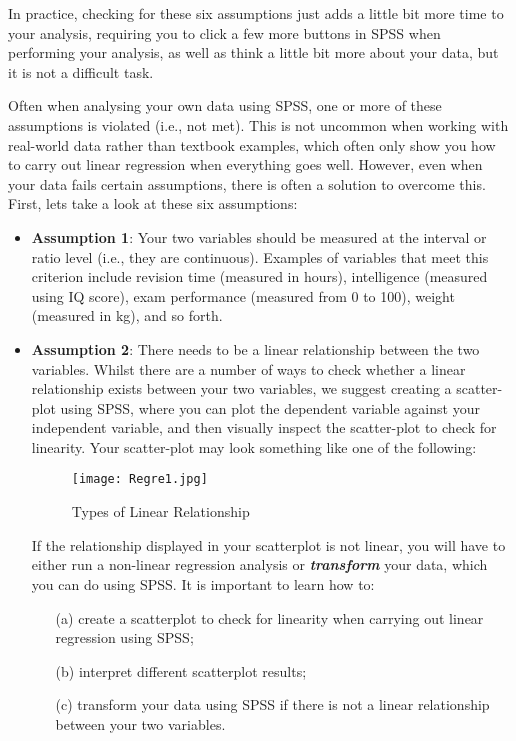 \documentclass[a4paper,12pt]{article}
\begin{document}
In practice, checking for these six assumptions just adds a little bit more time to your analysis, requiring you to click a few more buttons in SPSS when performing your analysis, as well as think a little bit more about your data, but it is not a difficult task.

Often when analysing your own data using SPSS, one or more of these assumptions is violated (i.e., not met). This is not uncommon when working with real-world data rather than textbook examples, which often only show you how to carry out linear regression when everything goes well. However, even when your data fails certain assumptions, there is often a solution to overcome this. First, lets take a look at these six assumptions:

\begin{itemize}
\item \textbf{Assumption 1}: Your two variables should be measured at the interval or ratio level (i.e., they are continuous). Examples of variables that meet this criterion include revision time (measured in hours), intelligence (measured using IQ score), exam performance (measured from 0 to 100), weight (measured in kg), and so forth. 

\item \textbf{Assumption 2}: There needs to be a linear relationship between the two variables. Whilst there are a number of ways to check whether a linear relationship exists between your two variables, we suggest creating a scatter-plot using SPSS, where you can plot the dependent variable against your independent variable, and then visually inspect the scatter-plot to check for linearity. Your scatter-plot may look something like one of the following:



\begin{figure}[h!]
\begin{centering}
  \texttt{[image: Regre1.jpg]}\\
  \caption{Types of Linear Relationship}
\end{centering}
\end{figure}
If the relationship displayed in your scatterplot is not linear, you will have to either run a non-linear regression analysis or \textbf{\textit{transform}} your data, which you can do using SPSS. It is important to learn how to:
\begin{itemize}
	\item[(a)] create a scatterplot to check for linearity when carrying out linear regression using SPSS; 
	\item[(b)] interpret different scatterplot results; 
	\item[(c)] transform your data using SPSS if there is not a linear relationship between your two variables.
\end{itemize} 



\end{itemize}
\end{document}
